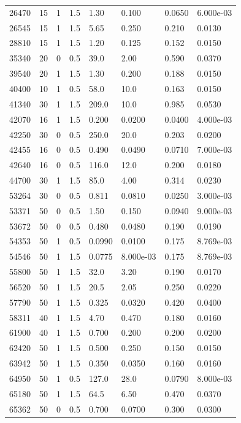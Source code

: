\documentclass[preview]{standalone}
\begin{document}
{{\begin{tabular}{L{1.2cm}C{1.2cm} C{0.3cm}C{0.5cm} C{1.4cm}C{1.4cm} C{1.4cm}C{1.4cm}}
  26470  &    15  & 1     & 1.5 &  1.30  & 0.100  & 0.0650 &  6.000e-03   \\ 
  26545  &    15  & 1     & 1.5 &  5.65  & 0.250  & 0.210 &  0.0130   \\ 
  28810  &    15  & 1     & 1.5 &  1.20  & 0.125  & 0.152 &  0.0150   \\ 
  35340  &    20  & 0     & 0.5 &  39.0  & 2.00  & 0.590 &  0.0370   \\ 
  39540  &    20  & 1     & 1.5 &  1.30  & 0.200  & 0.188 &  0.0150   \\ 
  40400  &    10  & 1     & 0.5 &  58.0  & 10.0  & 0.163 &  0.0150   \\ 
  41340  &    30  & 1     & 1.5 &  209.0  & 10.0  & 0.985 &  0.0530   \\ 
  42070  &    16  & 1     & 1.5 &  0.200  & 0.0200  & 0.0400 &  4.000e-03   \\ 
  42250  &    30  & 0     & 0.5 &  250.0  & 20.0  & 0.203 &  0.0200   \\ 
  42455  &    16  & 0     & 0.5 &  0.490  & 0.0490  & 0.0710 &  7.000e-03   \\ 
  42640  &    16  & 0     & 0.5 &  116.0  & 12.0  & 0.200 &  0.0180   \\ 
  44700  &    30  & 1     & 1.5 &  85.0  & 4.00  & 0.314 &  0.0230   \\ 
  53264  &    30  & 0     & 0.5 &  0.811  & 0.0810  & 0.0250 &  3.000e-03   \\ 
  53371  &    50  & 0     & 0.5 &  1.50  & 0.150  & 0.0940 &  9.000e-03   \\ 
  53672  &    50  & 0     & 0.5 &  0.480  & 0.0480  & 0.190 &  0.0190   \\ 
  54353  &    50  & 1     & 0.5 &  0.0990  & 0.0100  & 0.175 &  8.769e-03   \\ 
  54546  &    50  & 1     & 1.5 &  0.0775  & 8.000e-03  & 0.175 &  8.769e-03   \\ 
  55800  &    50  & 1     & 1.5 &  32.0  & 3.20  & 0.190 &  0.0170   \\ 
  56520  &    50  & 1     & 1.5 &  20.5  & 2.05  & 0.250 &  0.0220   \\ 
  57790  &    50  & 1     & 1.5 &  0.325  & 0.0320  & 0.420 &  0.0400   \\ 
  58311  &    40  & 1     & 1.5 &  4.70  & 0.470  & 0.180 &  0.0160   \\ 
  61900  &    40  & 1     & 1.5 &  0.700  & 0.200  & 0.200 &  0.0200   \\ 
  62420  &    50  & 1     & 1.5 &  0.500  & 0.250  & 0.150 &  0.0150   \\ 
  63942  &    50  & 1     & 1.5 &  0.350  & 0.0350  & 0.160 &  0.0160   \\ 
  64950  &    50  & 1     & 0.5 &  127.0  & 28.0  & 0.0790 &  8.000e-03   \\ 
  65180  &    50  & 1     & 1.5 &  64.5  & 6.50  & 0.470 &  0.0370   \\ 
  65362  &    50  & 0     & 0.5 &  0.700  & 0.0700  & 0.300 &  0.0300   \\ 
\hline 
\end{tabular} 

}}
\end{document}

